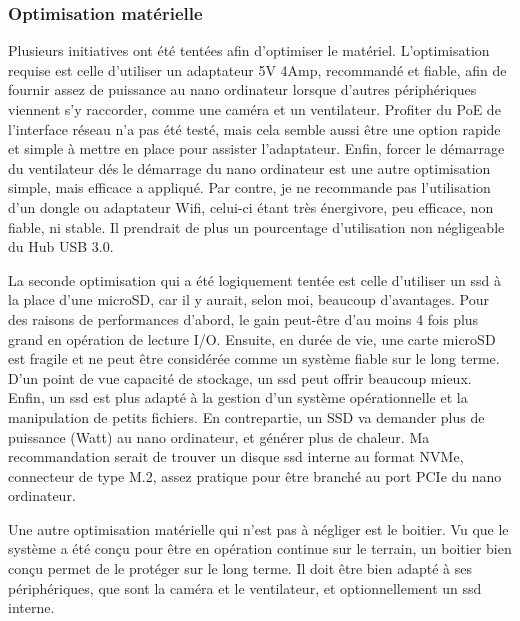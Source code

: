 \subsubsection{Optimisation matérielle}
\par Plusieurs initiatives ont été tentées afin d'optimiser le matériel. L'optimisation requise est celle d'utiliser un adaptateur 5V 4Amp, recommandé et fiable, afin de fournir assez de puissance au nano ordinateur lorsque d'autres périphériques viennent s'y raccorder, comme une caméra et un ventilateur. Profiter du PoE de l'interface réseau n'a pas été testé, mais cela semble aussi être une option rapide et simple à mettre en place pour assister l'adaptateur. Enfin, forcer le démarrage du ventilateur dés le démarrage du nano ordinateur est une autre optimisation simple, mais efficace a appliqué. Par contre, je ne recommande pas l'utilisation d'un dongle ou adaptateur Wifi, celui-ci étant très énergivore, peu efficace, non fiable, ni stable. Il prendrait de plus un pourcentage d'utilisation non négligeable du Hub USB 3.0. 
\par La seconde optimisation qui a été logiquement tentée est celle d'utiliser un \acrshort{ssd} à la place d'une microSD, car il y aurait, selon moi, beaucoup d'avantages. Pour des raisons de performances d'abord, le gain peut-être d'au moins 4 fois plus grand en opération de lecture I/O. Ensuite, en durée de vie, une carte microSD est fragile et ne peut être considérée comme un système fiable sur le long terme. D'un point de vue capacité de stockage, un \acrshort{ssd} peut offrir beaucoup mieux. Enfin, un \acrshort{ssd} est plus adapté à la gestion d'un système opérationnelle et la manipulation de petits fichiers. En contrepartie, un SSD va demander plus de puissance (Watt) au nano ordinateur, et générer plus de chaleur. Ma recommandation serait de trouver un disque \acrshort{ssd} interne au format NVMe, connecteur de type M.2, assez pratique pour être branché au port PCIe du nano ordinateur.
\par Une autre optimisation matérielle qui n'est pas à négliger est le boitier. Vu que le système a été conçu pour être en opération continue sur le terrain, un boitier bien conçu permet de le protéger sur le long terme. Il doit être bien adapté à ses périphériques, que sont la caméra et le ventilateur, et optionnellement un \acrshort{ssd} interne.
